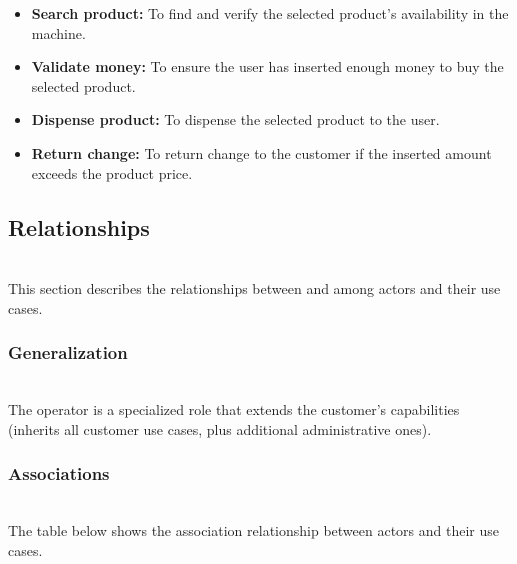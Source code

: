 \begin{itemize}
\item
\protect{}\label{r50ZPYbnv-sb0yUMKzIyY}
\textbf{Search product:} To find and verify the selected product's availability in the machine.
\item
\protect{}\label{FJ5nqHH_Pw_i3xZusT_GC}
\textbf{Validate money:} To ensure the user has inserted enough money to buy the selected product.
\item
\protect{}\label{9YH2kxc5nTyCGEHsMi8ij}
\textbf{Dispense product:} To dispense the selected product to the user.
\item
\protect{}\label{apNXaDyjBuu-KNrLOJtf6}
\textbf{Return change:} To return change to the customer if the inserted amount exceeds the product price.
\end{itemize}

\subsection{Relationships}\label{te1-x8h8cdjBhzPmb1ax4}
\\
This section describes the relationships between and among actors and their use cases.

\subsubsection{Generalization}\label{O7_Nfljk0nlI5xF8gFFW3}
\\
The operator is a specialized role that extends the customer's capabilities (inherits all customer use cases, plus additional administrative ones).

\subsubsection{Associations}\label{UZ7I9fLU2J0SCZh69PRIv}
\\
The table below shows the association relationship between actors and their use cases.

